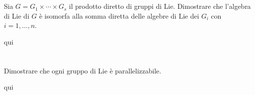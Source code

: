 \tocless\section{}\label{es3-11}

\begin{tcolorbox}
	Sia $ G = G_{1} \times \cdots \times G_{s} $ il prodotto diretto di gruppi di Lie. Dimostrare che l'algebra di Lie di $ G $ è isomorfa alla somma diretta delle algebre di Lie dei $ G_{i} $ con $ i=1,\dots,n $.
\end{tcolorbox}

qui

\tocless\section{}\label{es3-12}

\begin{tcolorbox}
	Dimostrare che ogni gruppo di Lie è parallelizzabile.
\end{tcolorbox}

qui
